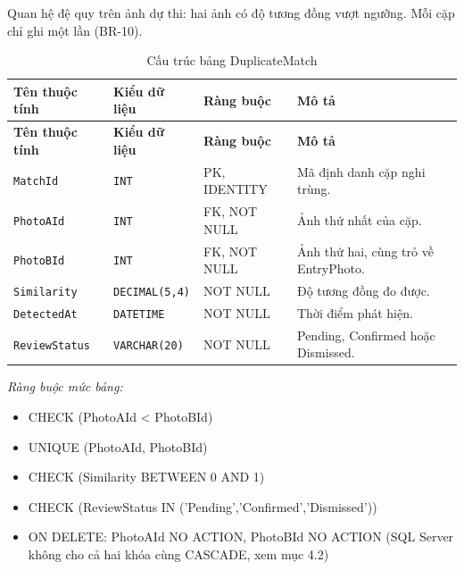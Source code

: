Quan hệ đệ quy trên ảnh dự thi: hai ảnh có độ tương đồng vượt ngưỡng. Mỗi cặp chỉ ghi một lần (BR-10).

\begin{longtable}{|L{4cm}|L{3.15cm}|L{2.4cm}|L{4.55cm}|}
\caption{Cấu trúc bảng DuplicateMatch} \\
\hline
\textbf{Tên thuộc tính} & \textbf{Kiểu dữ liệu} & \textbf{Ràng buộc} & \textbf{Mô tả} \\ \hline
\endfirsthead
\hline
\textbf{Tên thuộc tính} & \textbf{Kiểu dữ liệu} & \textbf{Ràng buộc} & \textbf{Mô tả} \\ \hline
\endhead
\texttt{MatchId} & \texttt{INT} & PK, IDENTITY & Mã định danh cặp nghi trùng. \\ \hline
\texttt{PhotoAId} & \texttt{INT} & FK, NOT NULL & Ảnh thứ nhất của cặp. \\ \hline
\texttt{PhotoBId} & \texttt{INT} & FK, NOT NULL & Ảnh thứ hai, cùng trỏ về EntryPhoto. \\ \hline
\texttt{Similarity} & \texttt{DECIMAL(5,4)} & NOT NULL & Độ tương đồng đo được. \\ \hline
\texttt{DetectedAt} & \texttt{DATETIME} & NOT NULL & Thời điểm phát hiện. \\ \hline
\texttt{ReviewStatus} & \texttt{VARCHAR(20)} & NOT NULL & Pending, Confirmed hoặc Dismissed. \\ \hline
\end{longtable}

\noindent\textit{Ràng buộc mức bảng:}

\begin{itemize}\raggedright
    \item CHECK (PhotoAId < PhotoBId)
    \item UNIQUE (PhotoAId,\allowbreak{} PhotoBId)
    \item CHECK (Similarity BETWEEN 0 AND 1)
    \item CHECK (ReviewStatus IN ('Pending',\allowbreak{}'Confirmed',\allowbreak{}'Dismissed'))
    \item ON DELETE: PhotoAId NO ACTION,\allowbreak{} PhotoBId NO ACTION (SQL Server không cho cả hai khóa cùng CASCADE, xem mục 4.2)
\end{itemize}

